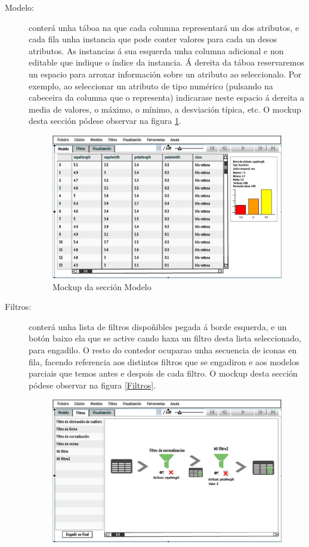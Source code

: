 \begin{description}
\item[Modelo:] \hfill
conterá unha táboa na que cada columna representará un dos atributos, e cada fila unha instancia que pode conter valores para cada un desos atributos. As instancias á sua esquerda unha columna adicional e non editable que indique o índice da instancia. Á dereita da táboa reservaremos un espacio para arroxar información sobre un atributo ao seleccionalo. Por exemplo, ao seleccionar un atributo de tipo numérico (pulsando na cabeceira da columna que o representa) indicarase neste espacio á dereita a media de valores, o máximo, o mínimo, a desviación típica, etc. O mockup desta sección pódese observar na figura \ref{Modelo}.
\begin{figure}
\centering
\includegraphics[width=\textwidth,height=\textheight,keepaspectratio]{figuras/Modelo}
\caption{Mockup da sección Modelo}
\label{Modelo}
\end{figure}
\item[Filtros:] \hfill
conterá unha lista de filtros dispoñibles pegada á borde esquerda, e un botón baixo ela que se active cando haxa un filtro desta lista seleccionado, para engadilo. O resto do contedor ocuparao unha secuencia de iconas en fila, facendo referencia aos distintos filtros que se engadiron e aos modelos parciais que temos antes e despois de cada filtro. O mockup desta sección pódese observar na figura \ref{Filtros}.
\begin{figure}
\centering
\includegraphics[width=\textwidth,height=\textheight,keepaspectratio]{figuras/Filtros}

\end{figure}
\end{description}
